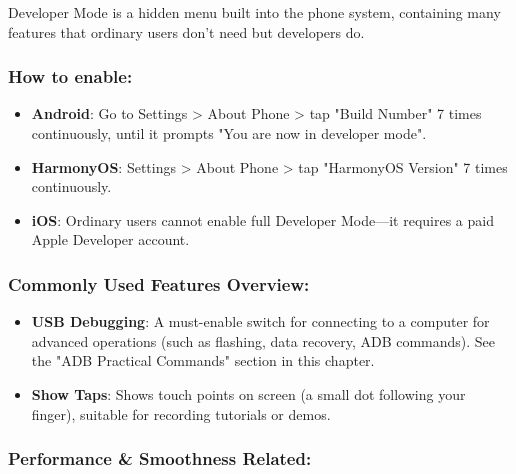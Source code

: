 


Developer Mode is a hidden menu built into the phone system, containing many features that ordinary users don't need but developers do.

\subsubsection*{How to enable:}

\begin{itemize}
  \item \textbf{Android}: Go to Settings > About Phone > tap "Build Number" 7 times continuously, until it prompts "You are now in developer mode".
  \item \textbf{HarmonyOS}: Settings > About Phone > tap "HarmonyOS Version" 7 times continuously.
  \item \textbf{iOS}: Ordinary users cannot enable full Developer Mode—it requires a paid Apple Developer account.
\end{itemize}

\subsubsection*{Commonly Used Features Overview:}

\begin{itemize}
  \item \textbf{USB Debugging}: A must-enable switch for connecting to a computer for advanced operations (such as flashing, data recovery, ADB commands). See the "ADB Practical Commands" section in this chapter.
  \item \textbf{Show Taps}: Shows touch points on screen (a small dot following your finger), suitable for recording tutorials or demos.
\end{itemize}

\subsubsection*{Performance \& Smoothness Related:}

